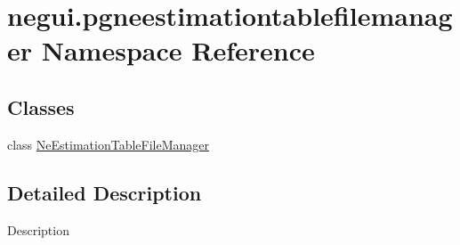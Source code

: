 \hypertarget{namespacenegui_1_1pgneestimationtablefilemanager}{}\section{negui.\+pgneestimationtablefilemanager Namespace Reference}
\label{namespacenegui_1_1pgneestimationtablefilemanager}
\subsection*{Classes}
\begin{DoxyCompactItemize}
\item 
class \hyperlink{classnegui_1_1pgneestimationtablefilemanager_1_1NeEstimationTableFileManager}{Ne\+Estimation\+Table\+File\+Manager}
\end{DoxyCompactItemize}


\subsection{Detailed Description}
\begin{DoxyVerb}Description
\end{DoxyVerb}
 